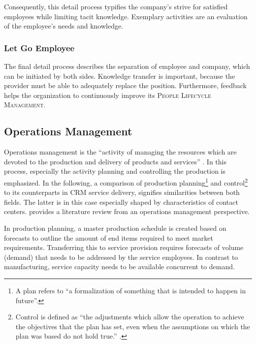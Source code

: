 	Consequently, this detail process typifies the company's strive for satisfied employees while limiting tacit knowledge. Exemplary activities are an evaluation of the employee's needs and knowledge. 
	
	\subsubsection{Let Go Employee}
	
	The final detail process describes the separation of employee and company, which can be initiated by both sides. Knowledge transfer is important, because the provider must be able to adequately replace the position. Furthermore, feedback helps the organization to continuously improve its  \textsc{People Lifecycle Management}.
	
	
	
	\subsection{Operations Management}
	\label{sec:wofom}
	Operations management is the \enquote{activity of managing the resources which are devoted to the production and delivery of products and services} \citep[]{0273708473}. In this process, especially the activity planning and controlling the production is emphasized. In the following, a comparison of production planning\footnote{A plan refers to \enquote{a formalization of something that is intended to happen in future}\citep[]{9780273756194}.} and control\footnote{Control is defined as \enquote{the adjustments which allow the operation to achieve the objectives that the plan has set, even when the assumptions on which the plan was based do not hold true.} \citep[]{9780273756194}. } \citep{9780130176158} to its counterparts in \acrshort{CRM} service delivery, signifies similarities between both fields. 
	The latter is in this case especially shaped by characteristics of contact centers. \cite{Aksin_2009} provides a  literature review from an operations management perspective. 
	
	In production planning, a master production schedule is created based on forecasts to outline the amount of end items required to meet market requirements. Transferring this to service provision requires forecasts of volume (demand) that needs to be addressed by the service employees. In contrast to manufacturing, service capacity needs to be available concurrent to demand. 

